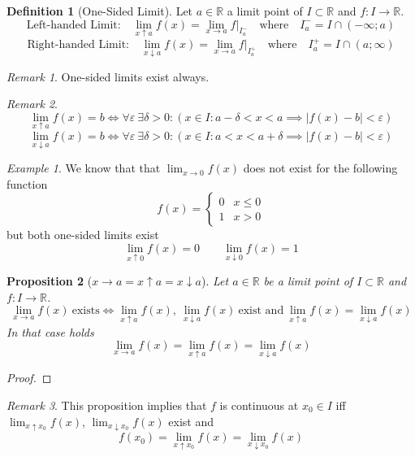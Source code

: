 \documentclass[english,titlepage]{uzhpub}
\theoremstyle{definition}
\newtheorem{definition}{Definition}[section]
\theoremstyle{plain}
\newtheorem{proposition}[definition]{Proposition}
\theoremstyle{remark}
\newtheorem*{remark}{Remark}
\theoremstyle{example}
\newtheorem*{example}{Example}
\begin{document}
   \begin{definition}[One-Sided Limit]
      Let \(a \in \mathbb{R}\) a limit point of \(I \subset \mathbb{R}\) and \(f: I \to \mathbb{R}\).
      \[\text{Left-handed Limit:}\quad \lim_{x \uparrow a}f(x) = \lim_{x \to a} f|_{I_a^-}\quad\text{where}\quad I_a^- = I \cap (-\infty; a)\]
      \[\text{Right-handed Limit:}\quad \lim_{x \downarrow a}f(x) = \lim_{x \to a} f|_{I_a^+} \quad\text{where}\quad I_a^+ = I \cap (a; \infty)\]
   \end{definition}
   \begin{remark}
      One-sided limits exist always.
   \end{remark}
   \begin{remark}
      \[\lim_{x \uparrow a} f(x) = b \iff \forall \varepsilon~\exists \delta > 0: (x \in I: a- \delta < x < a \implies |f(x) - b| < \varepsilon)\]
      \[\lim_{x \downarrow a} f(x) = b \iff \forall \varepsilon~\exists \delta > 0: (x \in I: a < x < a + \delta \implies |f(x) - b| < \varepsilon)\]
   \end{remark}
   \begin{example}
      We know that that \(\lim_{x \to 0} f(x)\) does not exist for the following function
      \[f(x) = \begin{cases}0 & x \leq 0\\ 1 & x > 0\end{cases}\]
      but both one-sided limits exist
      \[\lim_{x \uparrow 0} f(x) = 0 \qquad \lim_{x \downarrow 0} f(x) = 1\]
   \end{example}

   \begin{proposition}[\(x \to a = x \uparrow a = x \downarrow a\)]
      Let \(a \in \mathbb{R}\) be a limit point of \(I \subset \mathbb{R}\) and \(f: I \to \mathbb{R}\).
      \[\lim_{x \to a} f(x)~\text{exists} \iff \lim_{x \uparrow a} f(x),~\lim_{x \downarrow a} f(x)~\text{exist and}~\lim_{x \uparrow a} f(x) = \lim_{x \downarrow a} f(x)\]
      In that case holds
      \[\lim_{x \to a} f(x) = \lim_{x \uparrow a} f(x) = \lim_{x \downarrow a} f(x)\]
   \end{proposition}
   \begin{proof}
   \end{proof}
   \begin{remark}
      This proposition implies that \(f\) is continuous at \(x_0 \in I\) iff \(\lim_{x \uparrow x_0} f(x)\), \(\lim_{x \downarrow x_0} f(x)\) exist and
      \[f(x_0) = \lim_{x \uparrow x_0} f(x) = \lim_{x \downarrow x_0} f(x)\]
   \end{remark}
\end{document}
